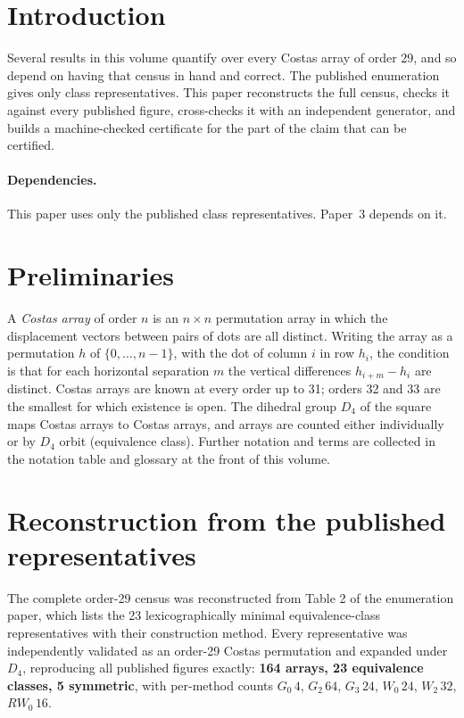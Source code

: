 \documentclass[11pt,a4paper,oneside]{report}
\theoremstyle{definition}
\begin{document}
\section{Introduction}\label{p4-sec:paperintro}
Several results in this volume quantify over every Costas array of order 29, and so depend on
having that census in hand and correct. The published enumeration~\cite{p4-drakakis29} gives only class representatives.
This paper reconstructs the full census, checks it against every published figure, cross-checks it
with an independent generator, and builds a machine-checked certificate for the part of the claim
that can be certified.

\paragraph{Dependencies.} This paper uses only the published class representatives. Paper~3 depends on it.

\section{Preliminaries}\label{p4-sec:notation}
A \emph{Costas array} of order $n$ is an $n\times n$ permutation array in which the displacement
vectors between pairs of dots are all distinct. Writing the array as a permutation $h$ of
$\{0,\dots,n-1\}$, with the dot of column $i$ in row $h_i$, the condition is that for each
horizontal separation $m$ the vertical differences $h_{i+m}-h_i$ are distinct. Costas arrays are
known at every order up to 31; orders 32 and 33 are the smallest for which existence is open. The
dihedral group $D_4$ of the square maps Costas arrays to Costas arrays, and arrays are counted
either individually or by $D_4$ orbit (equivalence class). Further notation and terms are collected
in the notation table and glossary at the front of this volume.

\section{Reconstruction from the published representatives}
\label{p4-sec:recon}
The complete order-29 census was reconstructed from Table 2 of the enumeration
paper, which lists the 23 lexicographically minimal equivalence-class
representatives with their construction method. Every representative was
independently validated as an order-29 Costas permutation and expanded under
$D_4$, reproducing all published figures exactly: \textbf{164 arrays, 23
equivalence classes, 5 symmetric}, with per-method counts
$G_0\,4$, $G_2\,64$, $G_3\,24$, $W_0\,24$, $W_2\,32$, $RW_0\,16$.
\end{document}

